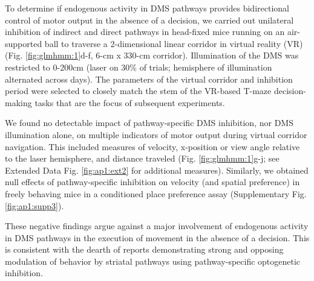 To determine if endogenous activity in DMS pathways provides bidirectional control of motor output in the absence of a decision, we carried out unilateral inhibition of indirect and direct pathways in head-fixed mice running on an air-supported ball to traverse a 2-dimensional linear corridor in virtual reality (VR) (Fig. \ref{fig:glmhmm:1}d-f, 6-cm x 330-cm corridor). Illumination of the DMS was restricted to 0-200cm (laser on 30\% of trials; hemisphere of illumination alternated across days). The parameters of the virtual corridor and inhibition period were selected to closely match the stem of the VR-based T-maze decision-making tasks that are the focus of subsequent experiments.

We found no detectable impact of pathway-specific DMS inhibition, nor DMS illumination alone, on multiple indicators of motor output during virtual corridor navigation. This included measures of velocity, x-position or view angle relative to the laser hemisphere, and distance traveled (Fig. \ref{fig:glmhmm:1}g-j; see Extended Data Fig. \ref{fig:ap1:ext2} for additional measures). Similarly, we obtained null effects of pathway-specific inhibition on velocity (and spatial preference) in freely behaving mice in a conditioned place preference assay (Supplementary Fig. \ref{fig:ap1:supp3}). 

These negative findings argue against a major involvement of endogenous activity in DMS pathways in the execution of movement in the absence of a decision. This is consistent with the dearth of reports demonstrating strong and opposing modulation of behavior by striatal pathways using pathway-specific optogenetic inhibition. 
